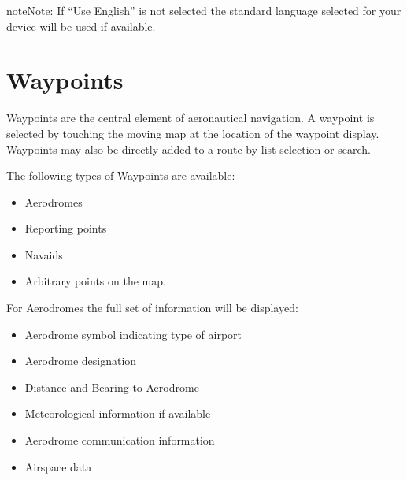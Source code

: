 \documentclass[letterpaper,10pt,english]{sphinxmanual}
\begin{document}
\begin{sphinxadmonition}{note}{Note:}
\sphinxAtStartPar
If “Use English” is not selected the standard language selected for your device will be used if available.
\end{sphinxadmonition}


\section{Waypoints}
\label{\detokenize{01-intro/further_steps:waypoints}}
\sphinxAtStartPar
Waypoints are the central element of aeronautical navigation. A waypoint is selected by touching the moving map at the location of the waypoint display. Waypoints may also be directly added to a route by list selection or search.

\sphinxAtStartPar
The following types of Waypoints are available:
\begin{itemize}
\item {} 
\sphinxAtStartPar
Aerodromes

\item {} 
\sphinxAtStartPar
Reporting points

\item {} 
\sphinxAtStartPar
Navaids

\item {} 
\sphinxAtStartPar
Arbitrary points on the map.

\end{itemize}

\sphinxAtStartPar
For Aerodromes the full set of information will be displayed:
\begin{itemize}
\item {} 
\sphinxAtStartPar
Aerodrome symbol indicating type of airport

\item {} 
\sphinxAtStartPar
Aerodrome designation

\item {} 
\sphinxAtStartPar
Distance and Bearing to Aerodrome

\item {} 
\sphinxAtStartPar
Meteorological information if available

\item {} 
\sphinxAtStartPar
Aerodrome communication information

\item {} 
\sphinxAtStartPar
Airspace data

\end{itemize}
\end{document}
